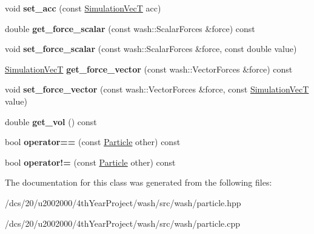 \begin{DoxyCompactItemize}
\mbox{\label{classwash_1_1Particle_a395e095de0b2af7dfc925bedef2090a1}} 
void {\bfseries set\+\_\+acc} (const \mbox{\hyperlink{classwash_1_1Vec}{Simulation\+VecT}} acc)
\item 
\mbox{\label{classwash_1_1Particle_a66c3fbeab11fc89a5c617e08e8bf939a}} 
double {\bfseries get\+\_\+force\+\_\+scalar} (const wash\+::\+Scalar\+Forces \&force) const
\item 
\mbox{\label{classwash_1_1Particle_a82251f50d3a7945cafba3acc024999cd}} 
void {\bfseries set\+\_\+force\+\_\+scalar} (const wash\+::\+Scalar\+Forces \&force, const double value)
\item 
\mbox{\label{classwash_1_1Particle_af2a2ba0ab82870eef8fa01286da74e6d}} 
\mbox{\hyperlink{classwash_1_1Vec}{Simulation\+VecT}} {\bfseries get\+\_\+force\+\_\+vector} (const wash\+::\+Vector\+Forces \&force) const
\item 
\mbox{\label{classwash_1_1Particle_af883effe9b1296851ffec68ed1fcd5e7}} 
void {\bfseries set\+\_\+force\+\_\+vector} (const wash\+::\+Vector\+Forces \&force, const \mbox{\hyperlink{classwash_1_1Vec}{Simulation\+VecT}} value)
\item 
\mbox{\label{classwash_1_1Particle_ab16021a2c003de07dc0a418ffc3d5eb7}} 
double {\bfseries get\+\_\+vol} () const
\item 
\mbox{\label{classwash_1_1Particle_ac227f2025f8ebe13496ad6fcabed02c8}} 
bool {\bfseries operator==} (const \mbox{\hyperlink{classwash_1_1Particle}{Particle}} other) const
\item 
\mbox{\label{classwash_1_1Particle_a8b76d8cf0473fa740fed41e271e9b606}} 
bool {\bfseries operator!=} (const \mbox{\hyperlink{classwash_1_1Particle}{Particle}} other) const
\end{DoxyCompactItemize}


The documentation for this class was generated from the following files\+:\begin{DoxyCompactItemize}
\item 
/dcs/20/u2002000/4th\+Year\+Project/wash/src/wash/particle.\+hpp\item 
/dcs/20/u2002000/4th\+Year\+Project/wash/src/wash/particle.\+cpp\end{DoxyCompactItemize}

